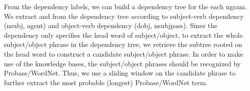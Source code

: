 
From the dependency labels, we can build a dependency tree for the each
ngram. We extract  and 
from the dependency tree according to subject-verb dependency (nsubj,
agent) and object-verb dependency (dobj, nsubjpass).
Since the dependency only specifies the head word of subject/object,
to extract the whole subject/object phrase in the dependency tree, we
retrieve the subtree rooted on the head word to construct a candidate
subject/object phrase. In order to make use of the knowledge bases,
the subject/object phrases should be recognized by Probase/WordNet.
Thus, we use a sliding window on the candidate phrase to further
extract the most probable (longest) Probase/WordNet term.



